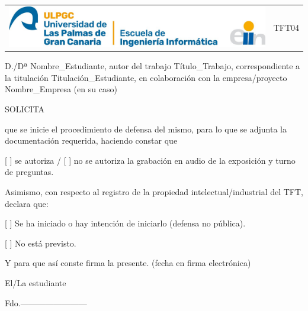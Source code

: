 
\thispagestyle{empty}

\begin{tabular}{p{15cm}p{5cm}}
  \includegraphics{Ilustraciones/LogoEII.jpg}   &  TFT04\\
\end{tabular}

\vspace{1em}
\fboxrule=2pt
\begin{center}
\end{center}

\vspace{1em}
\justify
D./Dª Nombre\_Estudiante, autor del trabajo Título\_Trabajo, correspondiente a la titulación Titulación\_Estudiante, en colaboración con la empresa/proyecto Nombre\_Empresa (en su caso)

\vspace{1em}
SOLICITA

\vspace{1em}
que se inicie el procedimiento de defensa del mismo, para lo que se adjunta la documentación requerida, haciendo constar que 

[ ] se autoriza / [ ] no se autoriza la grabación en audio de la exposición y turno de preguntas.

\vspace{1em}
Asimismo, con respecto al registro de la propiedad intelectual/industrial del TFT, declara que:

[ ] Se ha iniciado o hay intención de iniciarlo (defensa no pública).

[ ] No está previsto.

\vspace{1em}
Y para que así conste firma la presente. (fecha en firma electrónica)

\begin{center}

\vspace{1em}
El/La estudiante

\vspace{3em}
Fdo.------------------------
\end{center}

